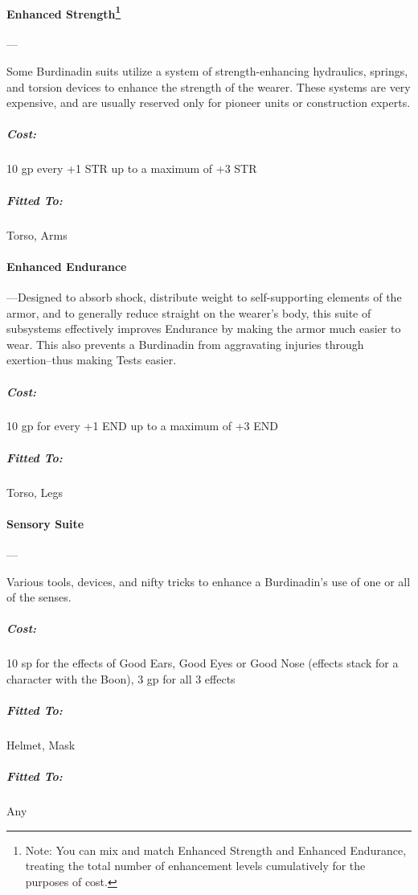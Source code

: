 \documentclass[oneside,11pt,english]{book}
\begin{document}
\paragraph[Enhanced Strength]{Enhanced Strength\footnote{Note: You can mix and match Enhanced Strength and Enhanced Endurance, treating the total number of enhancement levels cumulatively for the purposes of cost.} }---

Some Burdinadin suits utilize a system of strength-enhancing hydraulics, springs, and torsion devices to 
enhance the strength of the wearer. These systems are very expensive, and are usually reserved only for 
pioneer units or construction experts. 
\vspace{-15pt}\subparagraph{Cost:} 10 gp every +1 STR up to a maximum of +3 STR 
\vspace{-15pt}\subparagraph{Fitted To:} Torso, Arms

\paragraph[Enhanced Endurance]{Enhanced Endurance\footnotemark[\value{footnote}] }--- 
Designed to absorb shock, distribute weight to self-supporting elements of the armor, and to generally 
reduce straight on the wearer’s body, this suite of subsystems effectively improves Endurance by making 
the armor much easier to wear. This also prevents a Burdinadin from aggravating injuries through 
exertion--thus making  Tests easier. 
\vspace{-15pt}\subparagraph{Cost:} 10 gp for every +1 END up to a maximum of +3 END 
\vspace{-15pt}\subparagraph{Fitted To:} Torso, Legs 

\paragraph{Sensory Suite}---

Various tools, devices, and nifty tricks to enhance a Burdinadin’s use of one or all of the senses. 
\vspace{-15pt}\subparagraph{Cost:} 10 sp for the effects of Good Ears, Good Eyes or Good Nose (effects stack for a character with the Boon), 3 gp for all 3 effects
\vspace{-15pt}\subparagraph{Fitted To:} Helmet, Mask
\vspace{-15pt}\subparagraph{Fitted To:} Any
\end{document}
